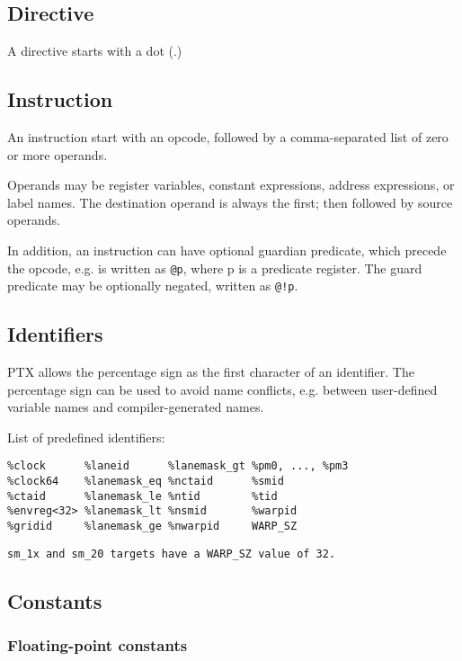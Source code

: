 \subsection{Directive}
\label{sec:directive}


A directive starts with a dot (.)

\subsection{Instruction}
\label{sec:instruction}

An instruction start with an opcode, followed by a comma-separated
list of zero or more operands. 

Operands may be register variables, constant expressions, address
expressions, or label names. The destination operand is always the
first; then followed by source operands.

In addition, an instruction can have optional guardian predicate,
which precede the opcode, e.g. is written as \verb!@p!, where p is a
predicate register. The guard predicate may be optionally negated,
written as \verb/@!p/.

\subsection{Identifiers}
\label{sec:identifiers}

PTX allows the percentage sign as the first character of an
identifier. The percentage sign can be used to avoid name conflicts,
e.g.  between user-defined variable names and compiler-generated
names. 

List of predefined identifiers:
\begin{verbatim}
%clock      %laneid      %lanemask_gt %pm0, ..., %pm3
%clock64    %lanemask_eq %nctaid      %smid
%ctaid      %lanemask_le %ntid        %tid
%envreg<32> %lanemask_lt %nsmid       %warpid
%gridid     %lanemask_ge %nwarpid     WARP_SZ
\end{verbatim}
\begin{verbatim}
sm_1x and sm_20 targets have a WARP_SZ value of 32.
\end{verbatim}

\subsection{Constants}
\label{sec:constants}

\subsubsection{Floating-point constants}
\label{sec:float-point-const}

